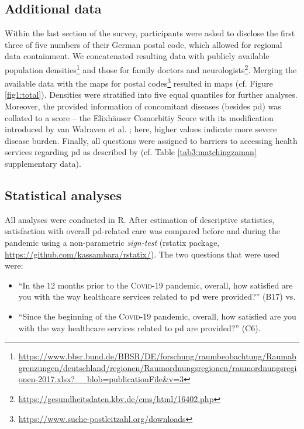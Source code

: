 \documentclass{bmcart}
\begin{document}
\subsection*{Additional data}
Within the last section of the survey, participants were asked to disclose the first three of five numbers of their German postal code, which allowed for regional data containment. We concatenated resulting data with publicly available population densities\footnote{\url{https://www.bbsr.bund.de/BBSR/DE/forschung/raumbeobachtung/Raumabgrenzungen/deutschland/regionen/Raumordnungsregionen/raumordnungsregionen-2017.xlsx?\_\_blob=publicationFile\&v=3}} and those for family doctors and neurologists\footnote{\url{https://gesundheitsdaten.kbv.de/cms/html/16402.php}}. Merging the available data with the maps for postal codes\footnote{\url{https://www.suche-postleitzahl.org/downloads}} resulted in maps (cf. Figure \ref{fig1:total}). Densities were stratified into five equal quantiles for further analyses. Moreover, the provided information of concomitant diseases (besides \ac{pd}) was collated to a score -- the Elixhäuser Comorbitiy Score with its modification introduced by van Walraven et al. \cite{van2009modification}; here, higher values indicate more severe disease burden. Finally, all questions were assigned to barriers to accessing health services regarding \ac{pd} as described by \cite{zaman2021barriers} (cf. Table \ref{tab3:matchingzaman} supplementary data).

\subsection*{Statistical analyses}
All analyses were conducted in R\cite{rcore}. After estimation of descriptive statistics, satisfaction with overall \ac{pd}-related care was compared before and during the pandemic using a non-parametric \textit{sign-test} (rstatix package, \url{https://github.com/kassambara/rstatix/}). The two questions that were used were: 
\begin{itemize}
\item ``In the 12 months prior to the  \textsc{Covid}-19 pandemic, overall, how satisfied are you with the way healthcare services related to \acl{pd} were provided?'' (B17) vs.
\item ``Since the beginning of the \textsc{Covid}-19 pandemic, overall, how satisfied are you with the way healthcare services related to \acl{pd} are provided?'' (C6).
\end{itemize}
\end{document}
